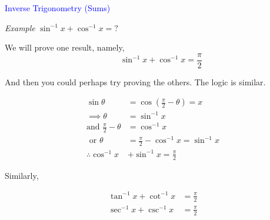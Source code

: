 \documentclass[14pt,fleqn]{extarticle}
\begin{document}
 

\begin{skill}
\textcolor{blue}{Inverse Trigonometry (Sums)}

\textit{Example } 
$\sin^{-1}x + \cos^{-1} x = ?$ 
\end{skill}

\newcard 

We will prove one result, namely, 
\[ \qquad \sin^{-1} x + \cos^{-1} x = \frac\pi{2} \]

And then you could perhaps try proving the others. The logic is similar. 


\begin{align}
\sin\theta &= \cos\left( \frac\pi{2} - \theta \right) = x \\
\implies \theta &= \sin^{-1} x \\
\text{and } \frac\pi{2} - \theta &= \cos^{-1} x \\
\text{ or } \theta &= \frac\pi{2} - \cos^{-1}x = \sin^{-1} x \\
\therefore \cos^{-1}x &+ \sin^{-1}x = \frac\pi{2}  
\end{align}

Similarly, 

%
\begin{align}
\tan^{-1}x + \cot^{-1}x &= \frac\pi{2} \\ 
\sec^{-1} x + \csc^{-1} x &= \frac\pi{2} 
\end{align}
\end{document}
